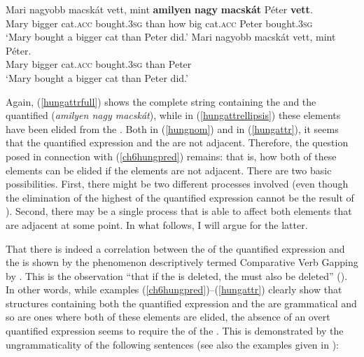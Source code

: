 \ea \label{hungattr}
\ea	\gll Mari nagyobb macskát vett, mint \textbf{amilyen} \textbf{nagy} \textbf{macskát} Péter \textbf{vett}. \label{hungattrfull}\\
Mary bigger	cat.\textsc{acc} bought.\textsc{3sg} than how big cat.\textsc{acc} Peter bought.\textsc{3sg}\\
\glt `Mary bought a bigger cat than Peter did.'
\ex \gll Mari nagyobb	macskát	vett,	mint Péter. \label{hungattrellipsis}\\
Mary bigger	cat.\textsc{acc} bought.\textsc{3sg} than	Peter\\
\glt `Mary bought a bigger cat than Peter did.'
\z
\z

Again, (\ref{hungattrfull}) shows the complete string containing the  and the quantified  (\textit{amilyen nagy macskát}), while in (\ref{hungattrellipsis}) these elements have been elided from the . Both in (\ref{hungnom}) and in (\ref{hungattr}), it seems that the quantified expression and the  are not adjacent. Therefore, the question posed in connection with (\ref{ch6hungpred}) remains: that is, how both of these elements can be elided if the elements are not adjacent. There are two basic possibilities. First, there might be two different processes involved (even though the elimination of the highest  of the quantified expression cannot be the result of ). Second, there may be a single process that is able to affect both elements that are adjacent at some point. In what follows, I will argue for the latter.

That there is indeed a correlation between the  of the quantified expression and the  is shown by the phenomenon descriptively termed Comparative Verb Gapping by \citet{bacskaiatkarikantor2012}. This is the observation ``that if the  is deleted, the  must also be deleted'' (\citealt[49]{bacskaiatkarikantor2012}). In other words, while examples (\ref{ch6hungpred})–(\ref{hungattr}) clearly show that structures containing both the quantified expression and the  are grammatical and so are ones where both of these elements are elided, the absence of an overt quantified expression seems to require the  of the . This is demonstrated by the ungrammaticality of the following sentences (see also the examples given in \citealt[54--56]{bacskaiatkarikantor2012}):

